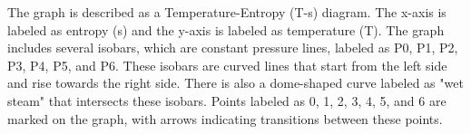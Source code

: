 The graph is described as a Temperature-Entropy (T-s) diagram. The x-axis is labeled as entropy (s) and the y-axis is labeled as temperature (T). The graph includes several isobars, which are constant pressure lines, labeled as P0, P1, P2, P3, P4, P5, and P6. These isobars are curved lines that start from the left side and rise towards the right side. There is also a dome-shaped curve labeled as "wet steam" that intersects these isobars. Points labeled as 0, 1, 2, 3, 4, 5, and 6 are marked on the graph, with arrows indicating transitions between these points.